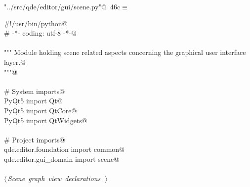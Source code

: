 \documentclass[
    a4paper,      %
    10pt,         %
    openright,    %
    notitlepage,  %
    parskip=half, %
]{scrreprt}       %
\theoremstyle{definition}                    %
\begin{document}
\begin{flushleft} \small
\begin{minipage}{\linewidth}\label{scrap56}\raggedright\small
{} \verb@"../src/qde/editor/gui/scene.py"@\nobreak\ {\footnotesize {46c}}$\equiv$
\vspace{-1ex}
\begin{list}{}{} \item
\mbox{}\lstinline@#!/usr/bin/python@\\
\mbox{}\lstinline@# -*- coding: utf-8 -*-@\\
\mbox{}\lstinline@@\\
\mbox{}\lstinline@""" Module holding scene related aspects concerning the graphical user interface layer.@\\
\mbox{}\lstinline@"""@\\
\mbox{}\lstinline@@\\
\mbox{}\lstinline@# System imports@\\
\mbox{}\lstinline@from PyQt5 import Qt@\\
\mbox{}\lstinline@from PyQt5 import QtCore@\\
\mbox{}\lstinline@from PyQt5 import QtWidgets@\\
\mbox{}\lstinline@@\\
\mbox{}\lstinline@# Project imports@\\
\mbox{}\lstinline@from qde.editor.foundation import common@\\
\mbox{}\lstinline@from qde.editor.gui_domain import scene@\\
\mbox{}\lstinline@@\\
\mbox{}\lstinline@@\hbox{$\langle\,${\itshape Scene graph view declarations}\nobreak\ {\footnotesize {}}$\,\rangle$}\lstinline@@\\
\mbox{}\lstinline@@{\NWsep}
\end{list}
\vspace{-1.5ex}
\footnotesize
\begin{list}{}{\setlength{\itemsep}{-\parsep}\setlength{\itemindent}{-\leftmargin}}

\item{}
\end{list}
\end{minipage}\vspace{4ex}
\end{flushleft}
\end{document}
